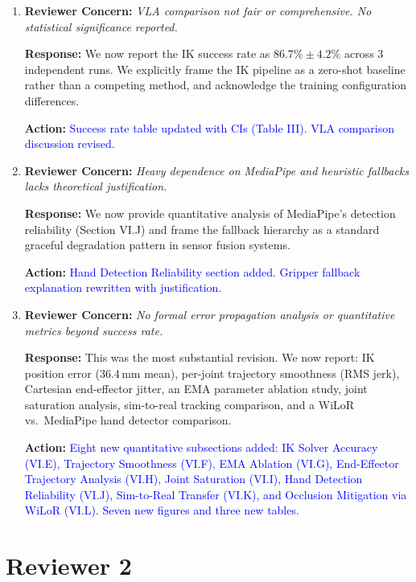 \documentclass[11pt]{article}
\newcommand{\concern}[1]{\textbf{Reviewer Concern:} \textit{#1}}
\newcommand{\response}[1]{\textbf{Response:} #1}
\newcommand{\action}[1]{\textbf{Action:} \textcolor{blue}{#1}}
\begin{document}
\begin{enumerate}[label=\textbf{R1.\arabic*}]
\action{Task choice justification added to Section V.B. Seven new quantitative evaluation subsections added (Sections VI.E--VI.K). Success rate now reported with confidence intervals across 3 runs.}

\item \concern{VLA comparison not fair or comprehensive. No statistical significance reported.}

\response{We now report the IK success rate as $86.7\% \pm 4.2\%$ across 3 independent runs. We explicitly frame the IK pipeline as a zero-shot baseline rather than a competing method, and acknowledge the training configuration differences.}

\action{Success rate table updated with CIs (Table III). VLA comparison discussion revised.}

\item \concern{Heavy dependence on MediaPipe and heuristic fallbacks lacks theoretical justification.}

\response{We now provide quantitative analysis of MediaPipe's detection reliability (Section VI.J) and frame the fallback hierarchy as a standard graceful degradation pattern in sensor fusion systems.}

\action{Hand Detection Reliability section added. Gripper fallback explanation rewritten with justification.}

\item \concern{No formal error propagation analysis or quantitative metrics beyond success rate.}

\response{This was the most substantial revision. We now report: IK position error (36.4\,mm mean), per-joint trajectory smoothness (RMS jerk), Cartesian end-effector jitter, an EMA parameter ablation study, joint saturation analysis, sim-to-real tracking comparison, and a WiLoR vs.\ MediaPipe hand detector comparison.}

\action{Eight new quantitative subsections added: IK Solver Accuracy (VI.E), Trajectory Smoothness (VI.F), EMA Ablation (VI.G), End-Effector Trajectory Analysis (VI.H), Joint Saturation (VI.I), Hand Detection Reliability (VI.J), Sim-to-Real Transfer (VI.K), and Occlusion Mitigation via WiLoR (VI.L). Seven new figures and three new tables.}

\end{enumerate}

\section*{Reviewer 2}
\end{document}
